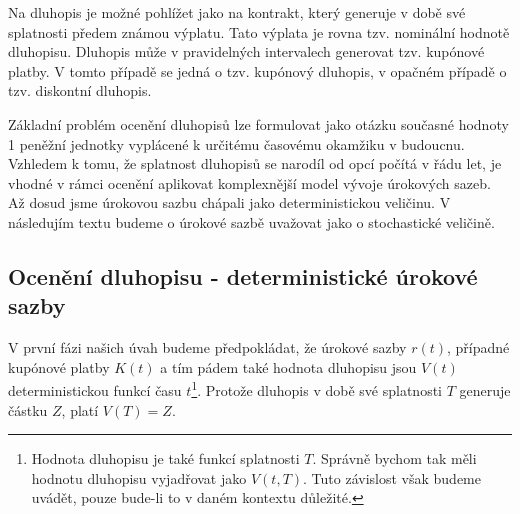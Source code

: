 \documentclass[a4paper]{book}
\begin{document}
Na dluhopis je možné pohlížet jako na kontrakt, který generuje v době své splatnosti předem známou výplatu. Tato výplata je rovna tzv. nominální hodnotě dluhopisu. Dluhopis může  v pravidelných intervalech generovat tzv. kupónové platby. V tomto případě se jedná o tzv. kupónový dluhopis, v opačném případě o tzv. diskontní dluhopis.

Základní problém ocenění dluhopisů lze formulovat jako otázku současné hodnoty 1 peněžní jednotky vyplácené k určitému časovému okamžiku v budoucnu. Vzhledem k tomu, že splatnost dluhopisů se narodíl od opcí počítá v řádu let, je vhodné v rámci ocenění aplikovat komplexnější model vývoje úrokových sazeb. Až dosud jsme úrokovou sazbu chápali jako deterministickou veličinu. V následujím textu budeme o úrokové sazbě uvažovat jako o stochastické veličině.

\subsection{Ocenění dluhopisu - deterministické úrokové sazby}

V první fázi našich úvah budeme předpokládat, že úrokové sazby $r(t)$, případné kupónové platby $K(t)$ a tím pádem také hodnota dluhopisu jsou $V(t)$ deterministickou funkcí času $t$\footnote{Hodnota dluhopisu je také funkcí splatnosti $T$. Správně bychom tak měli hodnotu dluhopisu vyjadřovat jako $V(t,T)$. Tuto závislost však budeme uvádět, pouze bude-li to v daném kontextu důležité.}. Protože dluhopis v době své splatnosti $T$ generuje částku $Z$, platí $V(T) = Z$.
\end{document}
